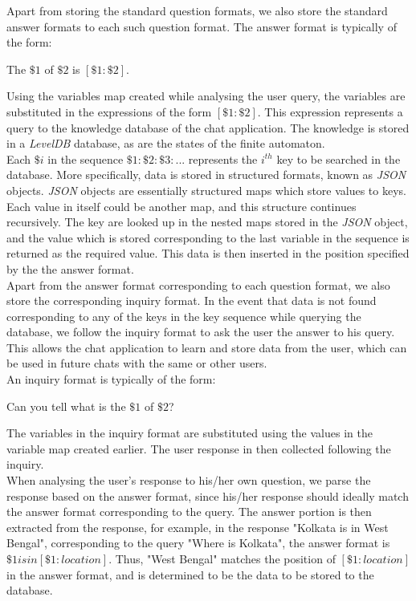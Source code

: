 \documentclass[12pt,a4paper]{article}
\begin{document}
Apart from storing the standard question formats, we also store the standard answer formats to each such question format. The answer format is typically of the form:

\begin{center}
The $\$1$ of $\$2$ is $[\$1:\$2]$.
\end{center}

Using the variables map created while analysing the user query, the variables are substituted in the expressions of the form $[\$1:\$2]$. This expression represents a query to the knowledge database of the chat application. The knowledge is stored in a \textit{LevelDB} database, as are the states of the finite automaton.\\

Each $\$i$ in the sequence $\$1:\$2:\$3:...$ represents the $i^{th}$ key to be searched in the database. More specifically, data is stored in structured formats, known as \textit{JSON} objects. \textit{JSON} objects are essentially structured maps which store values to keys. Each value in itself could be another map, and this structure continues recursively. The key are looked up in the nested maps stored in the \textit{JSON} object, and the value which is stored corresponding to the last variable in the sequence is returned as the required value. This data is then inserted in the position specified by the the answer format.\\

Apart from the answer format corresponding to each question format, we also store the corresponding inquiry format. In the event that data is not found corresponding to any of the keys in the key sequence while querying the database, we follow the inquiry format to ask the user the answer to his query. This allows the chat application to learn and store data from the user, which can be used in future chats with the same or other users.\\

An inquiry format is typically of the form:

\begin{center}
Can you tell what is the $\$1$ of $\$2$?
\end{center}

The variables in the inquiry format are substituted using the values in the variable map created earlier. The user response in then collected following the inquiry.\\

When analysing the user's response to his/her own question, we parse the response based on the answer format, since his/her response should ideally match the answer format corresponding to the query. The answer portion is then extracted from the response, for example, in the response "Kolkata is in West Bengal", corresponding to the query "Where is Kolkata", the answer format is $\$1 is in [\$1:location]$. Thus, "West Bengal" matches the position of $[\$1:location]$ in the answer format, and is determined to be the data to be stored to the database.\\
\end{document}
